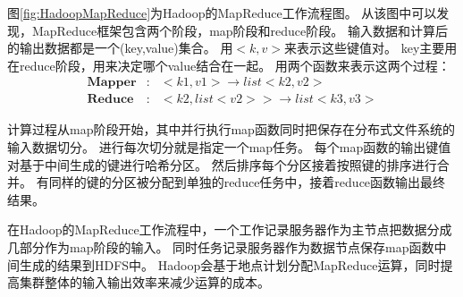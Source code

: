 图\ref{fig:HadoopMapReduce}为Hadoop的MapReduce工作流程图。
从该图中可以发现，MapReduce框架包含两个阶段，map阶段和reduce阶段。
输入数据和计算后的输出数据都是一个(key,value)集合。
用$<k,v>$来表示这些键值对。
key主要用在reduce阶段，用来决定哪个value结合在一起。
用两个函数来表示这两个过程：
\begin{eqnarray}
\mathbf{Mapper} &:& <k1,v1> \rightarrow list<k2,v2> \\
\mathbf{Reduce} &:& <k2,list<v2>> \rightarrow list<k3,v3>
\end{eqnarray}

计算过程从map阶段开始，其中并行执行map函数同时把保存在分布式文件系统的输入数据切分。
进行每次切分就是指定一个map任务。
每个map函数的输出键值对基于中间生成的键进行哈希分区。
然后排序每个分区接着按照键的排序进行合并。
有同样的键的分区被分配到单独的reduce任务中，接着reduce函数输出最终结果。

在Hadoop的MapReduce工作流程中，一个工作记录服务器作为主节点把数据分成几部分作为map阶段的输入。
同时任务记录服务器作为数据节点保存map函数中间生成的结果到HDFS中。
Hadoop会基于地点计划分配MapReduce运算，同时提高集群整体的输入输出效率来减少运算的成本。
